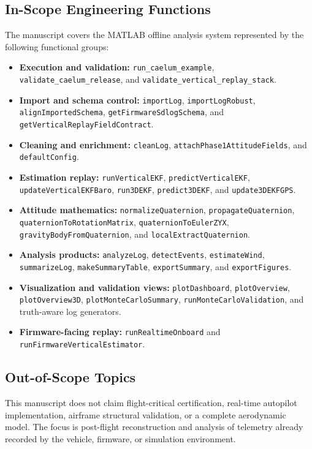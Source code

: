 \documentclass[colorlinks,upint,subscriptcorrection,varvw,hyphenate,balance]{asmeconf}
\newcommand{\code}[1]{\texttt{\allowbreak#1}}
\begin{document}
\subsection{In-Scope Engineering Functions}
The manuscript covers the MATLAB offline analysis system represented by the following functional groups:
\begin{itemize}[leftmargin=*]
\item \textbf{Execution and validation:} \code{run\_caelum\_example}, \code{validate\_caelum\_release}, and \code{validate\_vertical\_replay\_stack}.
\item \textbf{Import and schema control:} \code{importLog}, \code{importLogRobust}, \code{alignImportedSchema}, \code{getFirmwareSdlogSchema}, and \code{getVerticalReplayFieldContract}.
\item \textbf{Cleaning and enrichment:} \code{cleanLog}, \code{attachPhase1AttitudeFields}, and \code{defaultConfig}.
\item \textbf{Estimation replay:} \code{runVerticalEKF}, \code{predictVerticalEKF}, \code{updateVerticalEKFBaro}, \code{run3DEKF}, \code{predict3DEKF}, and \code{update3DEKFGPS}.
\item \textbf{Attitude mathematics:} \code{normalizeQuaternion}, \code{propagateQuaternion}, \code{quaternionToRotationMatrix}, \code{quaternionToEulerZYX}, \code{gravityBodyFromQuaternion}, and \code{localExtractQuaternion}.
\item \textbf{Analysis products:} \code{analyzeLog}, \code{detectEvents}, \code{estimateWind}, \code{summarizeLog}, \code{makeSummaryTable}, \code{exportSummary}, and \code{exportFigures}.
\item \textbf{Visualization and validation views:} \code{plotDashboard}, \code{plotOverview}, \code{plotOverview3D}, \code{plotMonteCarloSummary}, \code{runMonteCarloValidation}, and truth-aware log generators.
\item \textbf{Firmware-facing replay:} \code{runRealtimeOnboard} and \code{runFirmwareVerticalEstimator}.
\end{itemize}

\subsection{Out-of-Scope Topics}
This manuscript does not claim flight-critical certification, real-time autopilot implementation, airframe structural validation, or a complete aerodynamic model. The focus is post-flight reconstruction and analysis of telemetry already recorded by the vehicle, firmware, or simulation environment.
\end{document}
